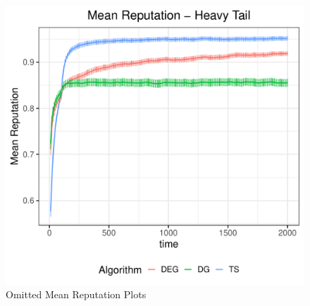 \documentclass[../competing_bandits_with_appendix.tex]{subfiles}
\begin{document}
\begin{figure}[h]
\begin{center}
\includegraphics[scale=0.3]{ec19paper/appendix_figures/ht_mean}
\caption{Omitted Mean Reputation Plots}
\end{center}
\end{figure}
%
\end{document}
